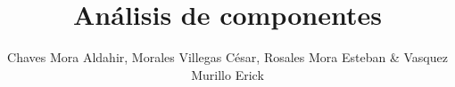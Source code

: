 \documentclass[%
    school=etsisi,%
    type=pfm,%
    degree=61TI,%
    authorsex=m,%
    directorsex=f,%
]{upm-report}
\author{Chaves Mora Aldahir, Morales Villegas César, Rosales Mora Esteban \& Vasquez Murillo Erick}
\title{Análisis de componentes}
\begin{document}


\frontmatter

\tableofcontents
\listoffigures
\listoftables


\mainmatter











\printbibliography







\printglossary
\end{document}
